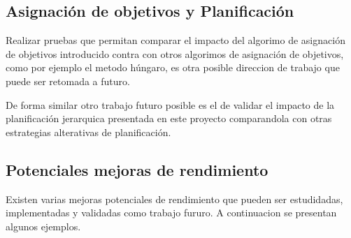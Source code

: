 






\subsection{Asignación de objetivos y Planificación}

Realizar pruebas que permitan comparar el impacto del algorimo de asignación de
objetivos introducido contra con otros algorimos de asignación de objetivos,
como por ejemplo el metodo húngaro, es otra posible direccion de trabajo que
puede ser retomada a futuro.

De forma similar otro trabajo futuro posible es el de validar el impacto de la
planificación jerarquica presentada en este proyecto comparandola con otras
estrategias alterativas de planificación. 

\subsection{Potenciales mejoras de rendimiento}


Existen varias mejoras potenciales de rendimiento que pueden ser estudidadas,
implementadas y validadas como trabajo fururo. A continuacion se presentan
algunos ejemplos.

